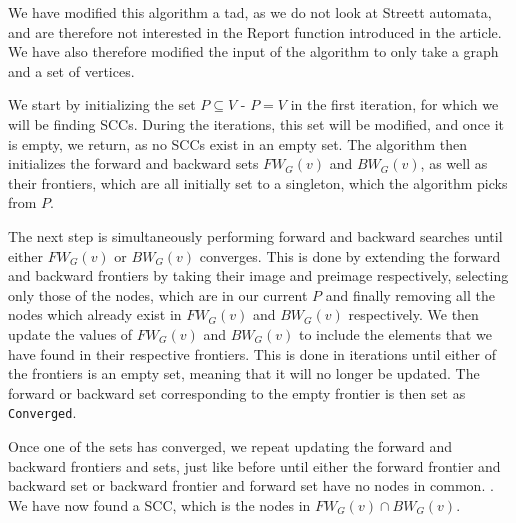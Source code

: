 \documentclass[../master.tex]{subfiles}
\newcommand{\FW}[2][G]{\ensuremath{FW_{#1}(#2)}}
\newcommand{\BW}[2][G]{\ensuremath{BW_{#1}(#2)}}
\begin{document}
We have modified this algorithm a tad, as we do not look at Streett automata, and are therefore not interested in the Report function introduced in the article. We have also therefore modified the input of the algorithm to only take a graph and a set of vertices. 

We start by initializing the set $P\subseteq V$ - $P=V$ in the first iteration, for which we will be finding SCCs. During the iterations, this set will be modified, and once it is empty, we return, as no SCCs exist in an empty set. The algorithm then initializes the forward and backward sets \FW{v} and \BW{v}, as well as their frontiers, which are all initially set to a singleton, which the algorithm picks from $P$.

The next step is simultaneously performing forward and backward searches until either \FW{v} or \BW{v} converges. This is done by extending the forward and backward frontiers by taking their image and preimage respectively, selecting only those of the nodes, which are in our current $P$ and finally removing all the nodes which already exist in \FW{v} and \BW{v} respectively. We then update the values of \FW{v} and \BW{v} to include the elements that we have found in their respective frontiers. This is done in iterations until either of the frontiers is an empty set, meaning that it will no longer be updated. The forward or backward set corresponding to the empty frontier is then set as \texttt{Converged}.

Once one of the sets has converged, we repeat updating the forward and backward frontiers and sets, just like before until either the forward frontier and backward set or backward frontier and forward set have no nodes in common. .
We have now found a SCC, which is the nodes in $\FW{v}\cap\BW{v}$. 
\end{document}
